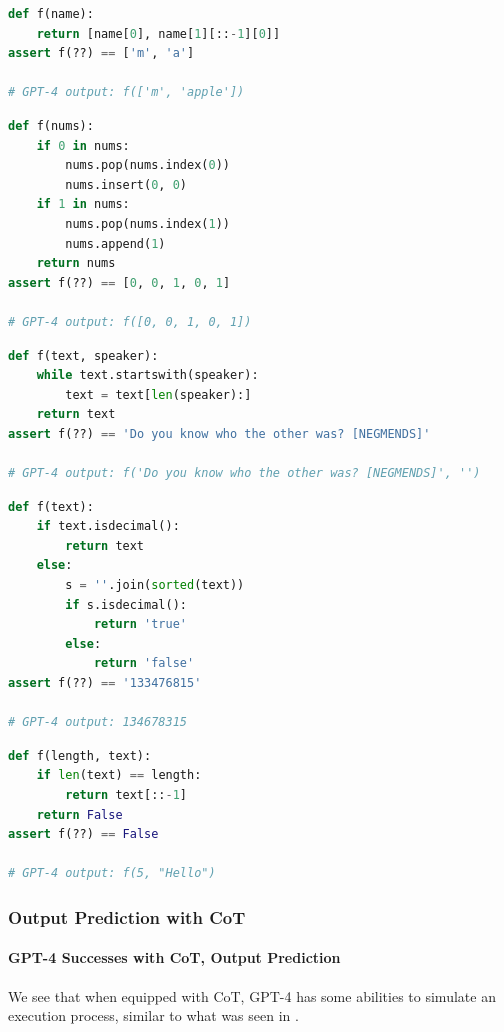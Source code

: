 \begin{lstlisting}[language=python]
def f(name):
    return [name[0], name[1][::-1][0]]
assert f(??) == ['m', 'a']

# GPT-4 output: f(['m', 'apple'])
\end{lstlisting}

\begin{lstlisting}[language=python]
def f(nums):
    if 0 in nums:
        nums.pop(nums.index(0))
        nums.insert(0, 0)
    if 1 in nums:
        nums.pop(nums.index(1))
        nums.append(1)
    return nums
assert f(??) == [0, 0, 1, 0, 1]

# GPT-4 output: f([0, 0, 1, 0, 1])
\end{lstlisting}

\begin{lstlisting}[language=python]
def f(text, speaker):
    while text.startswith(speaker):
        text = text[len(speaker):]
    return text
assert f(??) == 'Do you know who the other was? [NEGMENDS]'

# GPT-4 output: f('Do you know who the other was? [NEGMENDS]', '')
\end{lstlisting}

\begin{lstlisting}[language=python]
def f(text):
    if text.isdecimal():
        return text
    else:
        s = ''.join(sorted(text))
        if s.isdecimal():
            return 'true'
        else:
            return 'false'
assert f(??) == '133476815'

# GPT-4 output: 134678315
\end{lstlisting}

\begin{lstlisting}[language=python]
def f(length, text):
    if len(text) == length:
        return text[::-1]
    return False
assert f(??) == False

# GPT-4 output: f(5, "Hello")
\end{lstlisting}

\subsubsection{Output Prediction with CoT}
\label{sub:output_cot}
\paragraph{GPT-4 Successes with CoT, Output Prediction}
We see that when equipped with CoT, GPT-4 has some abilities to simulate an execution process, similar to what was seen in \citep{nye2021show}.

